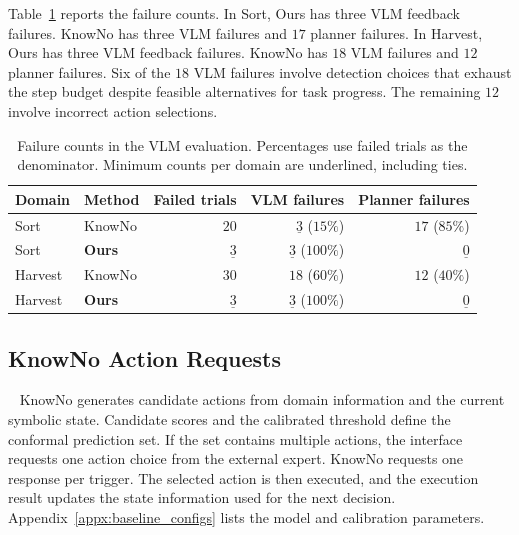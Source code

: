 Table~\ref{tab:app_vlm_failures} reports the failure counts. In Sort, Ours has three VLM feedback failures. KnowNo has three VLM failures and $17$ planner failures. In Harvest, Ours has three VLM feedback failures. KnowNo has $18$ VLM failures and $12$ planner failures. Six of the $18$ VLM failures involve detection choices that exhaust the step budget despite feasible alternatives for task progress. The remaining $12$ involve incorrect action selections.

\begin{table}[!htbp]
\centering
\caption{Failure counts in the VLM evaluation. Percentages use failed trials as the denominator. Minimum counts per domain are underlined, including ties.}
\label{tab:app_vlm_failures}
\small
\begin{tabular}{llrrr}
\toprule
Domain & Method & Failed trials & VLM failures & Planner failures \\
\midrule
Sort & KnowNo & $20$ & $\underline{3}$ ($15\%$) & $17$ ($85\%$) \\
Sort & \textbf{Ours} & $\underline{3}$ & $\underline{3}$ ($100\%$) & $\underline{0}$ \\
Harvest & KnowNo & $30$ & $18$ ($60\%$) & $12$ ($40\%$) \\
Harvest & \textbf{Ours} & $\underline{3}$ & $\underline{3}$ ($100\%$) & $\underline{0}$ \\
\bottomrule
\end{tabular}
\end{table}

\subsection{KnowNo Action Requests}~\label{appx:knowno_impl}
KnowNo generates candidate actions from domain information and the current symbolic state. Candidate scores and the calibrated threshold define the conformal prediction set. If the set contains multiple actions, the interface requests one action choice from the external expert. KnowNo requests one response per trigger. The selected action is then executed, and the execution result updates the state information used for the next decision. Appendix~\ref{appx:baseline_configs} lists the model and calibration parameters.
